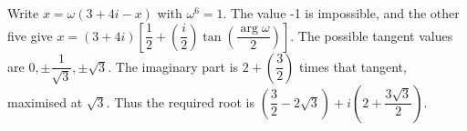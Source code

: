 Write $x=\omega(3+4i-x)$ with $\omega^6=1$. The value -1 is impossible, and the other five give $x=(3+4i)[\dfrac{1}{2}+(\dfrac{i}{2})\tan(\dfrac{\arg\omega}{2})]$. The possible tangent values are $0,\pm\dfrac{1}{\sqrt3},\pm\sqrt3$. The imaginary part is $2+(\dfrac{3}{2})$ times that tangent, maximised at $\sqrt3$. Thus the required root is $\boxed{(\dfrac{3}{2}-2\sqrt3)+i(2+\dfrac{3\sqrt3}{2})}$.
